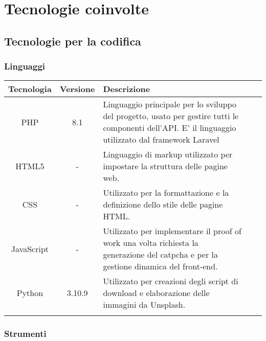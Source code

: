\section{Tecnologie coinvolte}

\subsection{Tecnologie per la codifica}

\subsubsection{Linguaggi}

\begin{center}
\setlength\extrarowheight{5pt}
\renewcommand\tabularxcolumn[1]{>{\Centering}m{#1}}
\begin{tabularx}{\textwidth}{| c | c | X | X | X |} 
	\hline
	\rowcolor{white}
	\textbf{Tecnologia} & \textbf{Versione} & \textbf{Descrizione}\\
	\hline
	PHP & 8.1 & Linguaggio principale per lo sviluppo del progetto, usato per gestire tutti le componenti dell'API. E' il linguaggio utilizzato dal framework Laravel\\
	\hline
	HTML5 & - & Linguaggio di markup utilizzato per impostare la struttura delle pagine web.\\
	\hline
	CSS & - & Utilizzato per la formattazione e la definizione dello stile delle pagine HTML.\\
	\hline
	JavaScript & - & Utilizzato per implementare il proof of work una volta richiesta la generazione del catpcha e per la gestione dinamica del front-end.\\
	\hline
	Python & 3.10.9 & Utilizzato per creazioni degli script di download e elaborazione delle immagini da Unsplash.\\
	\hline
	\rowcolor{white}
	\caption{Linguaggi utilizzati}
\end{tabularx}
\end{center}

\subsubsection{Strumenti}

